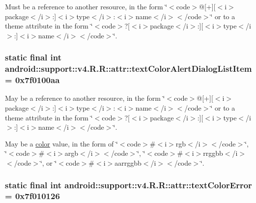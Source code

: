 Must be a reference to another resource, in the form \char`\"{}$<$code$>$@\mbox{[}+\mbox{]}\mbox{[}$<$i$>$package$<$/i$>$:\mbox{]}$<$i$>$type$<$/i$>$:$<$i$>$name$<$/i$>$$<$/code$>$\char`\"{} or to a theme attribute in the form \char`\"{}$<$code$>$?\mbox{[}$<$i$>$package$<$/i$>$:\mbox{]}\mbox{[}$<$i$>$type$<$/i$>$:\mbox{]}$<$i$>$name$<$/i$>$$<$/code$>$\char`\"{}. \hypertarget{classandroid_1_1support_1_1v4_1_1_r_1_1attr_1770aa530759048e6ba971f6a64b3481}{
\subsubsection[{textColorAlertDialogListItem}]{\setlength{\rightskip}{0pt plus 5cm}static final int android::support::v4.R.R::attr::textColorAlertDialogListItem = 0x7f0100aa}}
\label{classandroid_1_1support_1_1v4_1_1_r_1_1attr_1770aa530759048e6ba971f6a64b3481}


May be a reference to another resource, in the form \char`\"{}$<$code$>$@\mbox{[}+\mbox{]}\mbox{[}$<$i$>$package$<$/i$>$:\mbox{]}$<$i$>$type$<$/i$>$:$<$i$>$name$<$/i$>$$<$/code$>$\char`\"{} or to a theme attribute in the form \char`\"{}$<$code$>$?\mbox{[}$<$i$>$package$<$/i$>$:\mbox{]}\mbox{[}$<$i$>$type$<$/i$>$:\mbox{]}$<$i$>$name$<$/i$>$$<$/code$>$\char`\"{}. 

May be a \hyperlink{classandroid_1_1support_1_1v4_1_1_r_1_1color}{color} value, in the form of \char`\"{}$<$code$>$\#$<$i$>$rgb$<$/i$>$$<$/code$>$\char`\"{}, \char`\"{}$<$code$>$\#$<$i$>$argb$<$/i$>$$<$/code$>$\char`\"{}, \char`\"{}$<$code$>$\#$<$i$>$rrggbb$<$/i$>$$<$/code$>$\char`\"{}, or \char`\"{}$<$code$>$\#$<$i$>$aarrggbb$<$/i$>$$<$/code$>$\char`\"{}. \hypertarget{classandroid_1_1support_1_1v4_1_1_r_1_1attr_22d002247ac147c3edcb1450f594e9f4}{
\subsubsection[{textColorError}]{\setlength{\rightskip}{0pt plus 5cm}static final int android::support::v4.R.R::attr::textColorError = 0x7f010126}}
\label{classandroid_1_1support_1_1v4_1_1_r_1_1attr_22d002247ac147c3edcb1450f594e9f4}


